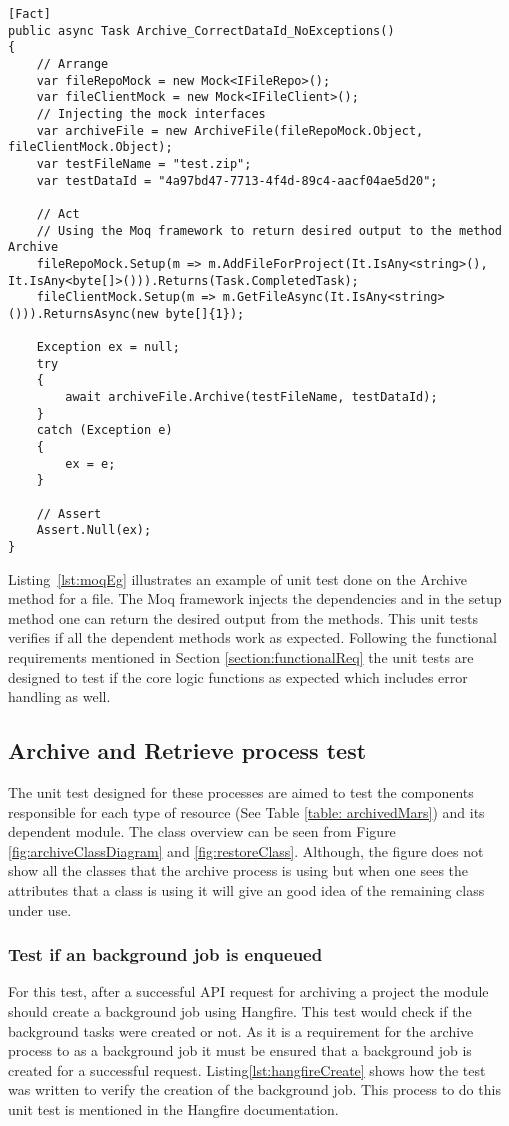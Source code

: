 \begin{lstlisting}[language={[Sharp]C}, caption={Example of faking objects using Moq framework}, captionpos=b,label={lst:moqEg}]
[Fact]
public async Task Archive_CorrectDataId_NoExceptions()
{
    // Arrange
    var fileRepoMock = new Mock<IFileRepo>();
    var fileClientMock = new Mock<IFileClient>();
    // Injecting the mock interfaces 
    var archiveFile = new ArchiveFile(fileRepoMock.Object, fileClientMock.Object);
    var testFileName = "test.zip";
    var testDataId = "4a97bd47-7713-4f4d-89c4-aacf04ae5d20";
    
    // Act
    // Using the Moq framework to return desired output to the method Archive
    fileRepoMock.Setup(m => m.AddFileForProject(It.IsAny<string>(), It.IsAny<byte[]>())).Returns(Task.CompletedTask);
    fileClientMock.Setup(m => m.GetFileAsync(It.IsAny<string>())).ReturnsAsync(new byte[]{1});

    Exception ex = null;
    try
    {
        await archiveFile.Archive(testFileName, testDataId);
    }
    catch (Exception e)
    {
        ex = e;
    }
    
    // Assert
    Assert.Null(ex);
}
\end{lstlisting}

Listing~\ref{lst:moqEg} illustrates an example of unit test done on the Archive method for a file. The Moq framework injects the dependencies and in the setup method
one can return the desired output from the methods. This unit tests verifies if all the dependent methods work as expected.
Following the functional requirements mentioned in Section \ref{section:functionalReq} the unit tests are designed to test if the core logic functions as expected which includes error handling as well.

\subsection{Archive and Retrieve process test}
The unit test designed for these processes are aimed to test the components responsible for each type of resource (See Table \ref{table: archivedMars}) and its 
dependent module. The class overview can be seen from Figure \ref{fig:archiveClassDiagram} and \ref{fig:restoreClass}. Although, the figure does not show all the classes that the archive process is using
but when one sees the attributes that a class is using it will give an good idea of the remaining class under use.

\subsubsection{Test if an background job is enqueued}
For this test, after a successful API request for archiving a project the module should create a background job using Hangfire. This test would check if the
background tasks were created or not. As it is a requirement for the archive process to as a background job it must be ensured that a background job is created 
for a successful request. Listing\ref{lst:hangfireCreate} shows how the test was written to verify the creation of the background job. This process to do this unit
test is mentioned in the Hangfire documentation.

